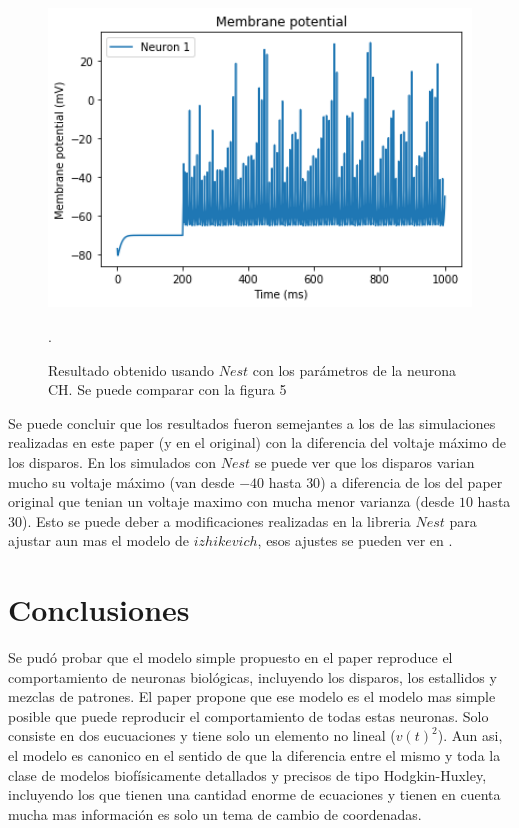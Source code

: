 \documentclass[12pt]{article}
\begin{document}
\begin{figure}[h!]
    \centering
        \includegraphics[height=8cm]{images/CH_nest.png}
    \caption[fontsize=2pt]{Resultado obtenido usando $Nest$ con los parámetros de la neurona CH. Se puede comparar con la figura 5}.
\end{figure}

\newpage

Se puede concluir que los resultados fueron semejantes a los de las simulaciones realizadas en este paper (y en el original) con la diferencia del voltaje máximo de los disparos.
En los simulados con $Nest$ se puede ver que los disparos varian mucho su voltaje máximo (van desde $-40$ hasta $30$) a diferencia de los del paper original que tenian un voltaje maximo con mucha menor varianza (desde $10$ hasta $30$).
Esto se puede deber a modificaciones realizadas en la libreria $Nest$ para ajustar aun mas el modelo de $izhikevich$, esos ajustes se pueden ver en \cite{nest_izhikevich}.

\newpage

\section{Conclusiones}

Se pudó probar que el modelo simple propuesto en el paper reproduce el comportamiento de neuronas biológicas, incluyendo los disparos, los estallidos y mezclas de patrones. El paper propone que ese modelo es el modelo mas simple posible que puede reproducir el comportamiento de todas estas neuronas.
Solo consiste en dos eucuaciones y tiene solo un elemento no lineal ($v(t)^2$).
Aun asi, el modelo es canonico en el sentido de que la diferencia entre el mismo y toda la clase de modelos biofísicamente detallados y precisos de tipo Hodgkin-Huxley, incluyendo los que tienen una cantidad enorme de ecuaciones y tienen en cuenta mucha mas información es solo un tema de cambio de coordenadas. \\
\end{document}
